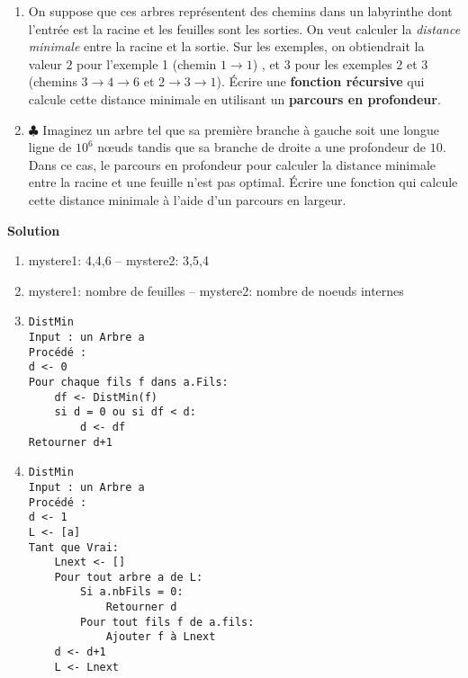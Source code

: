 \begin{exercice}[Partiel 2018]
\begin{enumerate}
\item On suppose que ces arbres représentent des chemins dans un labyrinthe dont l'entrée est la racine et les feuilles sont les sorties. On veut calculer la \emph{distance minimale} entre la racine et la sortie. Sur les exemples, on obtiendrait la valeur $2$ pour l'exemple 1 (chemin $1 \rightarrow 1$) , et $3$ pour les exemples $2$ et $3$ (chemins $3 \rightarrow 4 \rightarrow 6$ et $2 \rightarrow 3 \rightarrow 1$). \'Ecrire une \textbf{fonction récursive} qui calcule cette distance minimale en utilisant un \textbf{parcours en profondeur}.

\item $\clubsuit$ Imaginez un arbre tel que sa première branche à gauche soit une longue ligne de $10^6$ n\oe uds tandis que sa branche de droite a une profondeur de $10$. Dans ce cas, le parcours en profondeur pour calculer la distance minimale entre la racine et une feuille n'est pas optimal. \'Ecrire une fonction qui calcule cette distance minimale à l'aide d'un parcours en largeur.
\end{enumerate}

\textbf{Solution}

\begin{enumerate}
\item mystere1: 4,4,6 -- mystere2: 3,5,4
\item mystere1: nombre de feuilles -- mystere2: nombre de noeuds internes

\item

\begin{lstlisting}
DistMin
Input : un Arbre a
Procédé :
d <- 0
Pour chaque fils f dans a.Fils:
    df <- DistMin(f)
    si d = 0 ou si df < d:
        d <- df
Retourner d+1
\end{lstlisting}

\item

\begin{lstlisting}
DistMin
Input : un Arbre a
Procédé :
d <- 1
L <- [a]
Tant que Vrai:
    Lnext <- []
    Pour tout arbre a de L:
        Si a.nbFils = 0:
            Retourner d
        Pour tout fils f de a.fils:
            Ajouter f à Lnext
    d <- d+1
    L <- Lnext
\end{lstlisting}

\end{enumerate}


\end{exercice}